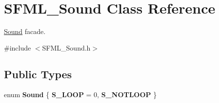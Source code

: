 \hypertarget{class_s_f_m_l___sound}{\section{S\-F\-M\-L\-\_\-\-Sound Class Reference}
\label{class_s_f_m_l___sound}
}


\hyperlink{class_sound}{Sound} facade.  




{\ttfamily \#include $<$S\-F\-M\-L\-\_\-\-Sound.\-h$>$}

\subsection*{Public Types}
\begin{DoxyCompactItemize}
\item 
enum {\bfseries Sound} \{ {\bfseries S\-\_\-\-L\-O\-O\-P} = 0, 
{\bfseries S\-\_\-\-N\-O\-T\-L\-O\-O\-P}
 \}
\end{DoxyCompactItemize}
